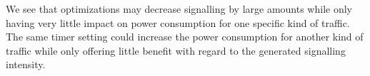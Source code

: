 We see that optimizations may decrease signalling by large amounts while only having very little impact on power consumption for one specific kind of traffic.
The same timer setting could increase the power consumption for another kind of traffic while only offering little benefit with regard to the generated signalling intensity.
